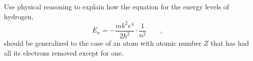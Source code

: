 Use physical reasoning to explain how the equation for
the energy levels of hydrogen,
\begin{equation*}
         E_n = -\frac{mk^2e^4}{2\hbar^2}\cdot\frac{1}{n^2}     \qquad   ,  
\end{equation*}
should be generalized to the case of an atom with
atomic number $Z$ that has had all its electrons removed
except for one.
